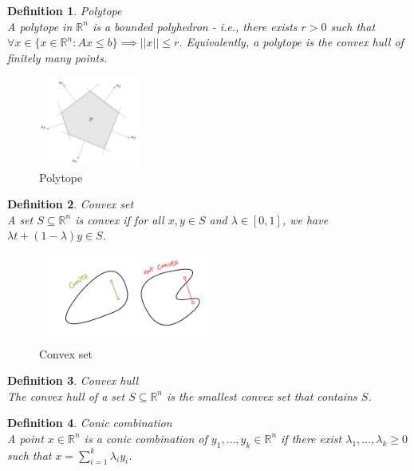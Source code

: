 \documentclass[11pt]{book} %
\newtheorem{definition}{Definition}[section]
\begin{document}
\begin{definition}{Polytope} \\
A polytope in $\mathbb{R}^n$ is a bounded polyhedron - i.e., there exists $r > 0$ such that $\forall x \in \{x \in \mathbb{R}^n : Ax \leq b\} \implies ||x|| \leq r$.
Equivalently, a polytope is the convex hull of finitely many points.
\end{definition}

\begin{figure}[H]
    \centering
    \includegraphics[width=0.3\textwidth]{Figs/polyhedron.png}
    \caption{Polytope}
\end{figure}

\begin{definition}{Convex set} \\
    A set $S \subseteq \mathbb{R}^n$ is convex if for all $x,y \in S$ and $\lambda \in [0,1]$, we have $\lambda t + (1- \lambda)y \in S$.
\end{definition}    

\begin{figure}[H]
    \centering
    \includegraphics[width=0.5\textwidth]{Figs/convex_set.png}
    \caption{Convex set}
\end{figure}

\begin{definition}{Convex hull} \\
The convex hull of a set $S \subseteq \mathbb{R}^n$ is the smallest convex set that contains $S$.
\end{definition}


\begin{definition}{Conic combination} \\
A point $x \in \mathbb{R}^n$ is a conic combination of $y_1, \ldots, y_k \in \mathbb{R}^n$ 
if there exist $\lambda_1, \ldots, \lambda_k \geq 0$ such that $x = \sum_{i=1}^k \lambda_i y_i$.    
\end{definition}
\end{document}
